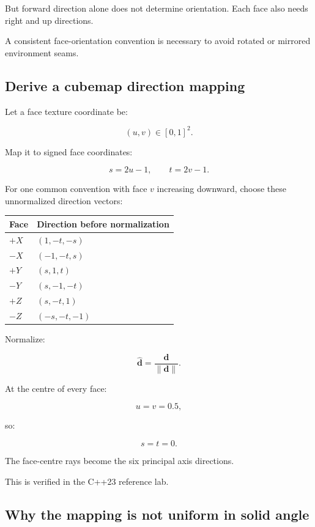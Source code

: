 But forward direction alone does not determine orientation. Each face also needs right and up directions.

A consistent face-orientation convention is necessary to avoid rotated or mirrored environment seams.

\subsection{Derive a cubemap direction mapping}\label{02-foundations-ii-ch035-derive-a-cubemap-direction-mapping}

Let a face texture coordinate be:

\[ (u,v)\in[0,1]^2. \]

Map it to signed face coordinates:

\[ s=2u-1, \qquad t=2v-1. \]

For one common convention with face \(v\) increasing downward, choose these unnormalized direction vectors:

{\def\LTcaptype{none} %
\begin{longtable}[]{@{}ll@{}}
\toprule\noalign{}
Face & Direction before normalization \\
\midrule\noalign{}
\endhead
\bottomrule\noalign{}
\endlastfoot
\(+X\) & \((1,-t,-s)\) \\
\(-X\) & \((-1,-t,s)\) \\
\(+Y\) & \((s,1,t)\) \\
\(-Y\) & \((s,-1,-t)\) \\
\(+Z\) & \((s,-t,1)\) \\
\(-Z\) & \((-s,-t,-1)\) \\
\end{longtable}
}

Normalize:

\[ \boxed{ \hat{\mathbf d}= \frac{\mathbf d}{\|\mathbf d\|}. } \]

At the centre of every face:

\[ u=v=0.5, \]

so:

\[ s=t=0. \]

The face-centre rays become the six principal axis directions.

This is verified in the C++23 reference lab.

\subsection{Why the mapping is not uniform in solid angle}\label{02-foundations-ii-ch035-why-the-mapping-is-not-uniform-in-solid-angle}

